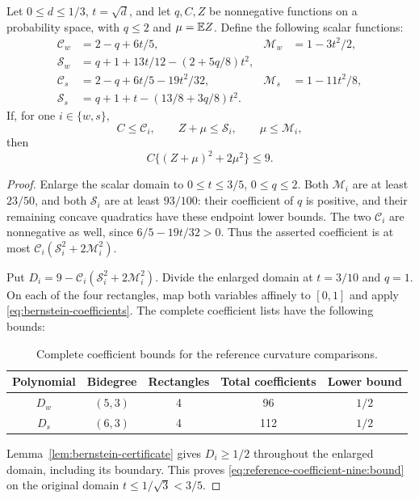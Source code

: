 \begin{lemma}\label{lem:reference-coefficient-nine}
Let \(0\le d\le1/3\), \(t=\sqrt d\), and let \(q,C,Z\) be
nonnegative functions on a probability space, with \(q\le2\)
and \(\mu=\mathbb E Z\). Define the following scalar functions:
\begin{equation}\label{eq:reference-coefficient-nine:data}
\begin{aligned}
 \mathcal C_w&=2-q+6t/5,&
 \mathcal M_w&=1-3t^2/2,\\
 \mathcal S_w&=q+1+13t/12-(2+5q/8)t^2,\\
 \mathcal C_s&=2-q+6t/5-19t^2/32,&
 \mathcal M_s&=1-11t^2/8,\\
 \mathcal S_s&=q+1+t-(13/8+3q/8)t^2.
\end{aligned}
\end{equation}
If, for one \(i\in\{w,s\}\),
\[
 C\le\mathcal C_i,\qquad Z+\mu\le\mathcal S_i,
 \qquad \mu\le\mathcal M_i,
\]
then
\begin{equation}\label{eq:reference-coefficient-nine:bound}
 C\{(Z+\mu)^2+2\mu^2\}\le9.
\end{equation}
\end{lemma}
\begin{proof}
Enlarge the scalar domain to \(0\le t\le3/5\), \(0\le q\le2\).
Both \(\mathcal M_i\) are at least \(23/50\), and both
\(\mathcal S_i\) are at least \(93/100\): their coefficient of
\(q\) is positive, and their remaining concave quadratics have
these endpoint lower bounds. The two \(\mathcal C_i\) are
nonnegative as well, since \(6/5-19t/32>0\).
Thus the asserted coefficient is at most
\(\mathcal C_i(\mathcal S_i^2+2\mathcal M_i^2)\).

Put \(D_i=9-\mathcal C_i(\mathcal S_i^2+2\mathcal M_i^2)\).
Divide the enlarged domain at \(t=3/10\) and \(q=1\).
On each of the four rectangles, map both variables affinely to
\([0,1]\) and apply \eqref{eq:bernstein-coefficients}.
The complete coefficient lists have the following bounds:
\begin{table}[htbp]\centering\small
\caption{Complete coefficient bounds for the reference curvature comparisons.}
\label{tab:reference-coefficient-nine:bernstein}
\begin{tabular}{@{}ccccc@{}}
\toprule
Polynomial&Bidegree&Rectangles&Total coefficients&Lower bound\\
\midrule
\(D_w\)&\((5,3)\)&4&96&\(1/2\)\\
\(D_s\)&\((6,3)\)&4&112&\(1/2\)\\
\bottomrule
\end{tabular}
\end{table}

Lemma~\ref{lem:bernstein-certificate} gives \(D_i\ge1/2\)
throughout the enlarged domain, including its boundary.
This proves \eqref{eq:reference-coefficient-nine:bound} on
the original domain \(t\le1/\sqrt3<3/5\).
\end{proof}
